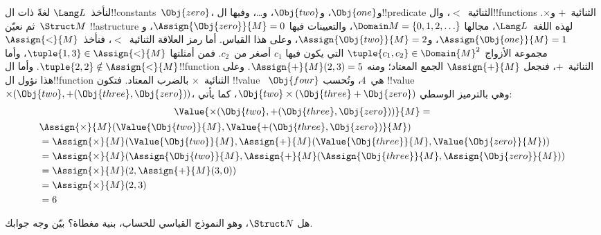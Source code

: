 \documentclass[../../../include/open-logic-section]{subfiles}
\begin{document}
\begin{ex}
لنأخذ~$\Lang L$ لغةً ذات ال!!{constant}s~$\Obj{zero}$،
و$\Obj{one}$، و$\Obj{two}$، و\dots، وفيها ال!!{predicate} الثنائية~$<$،
وال!!{function}s الثنائية~$+$ و$\times$. ثم نعيّن~$\Struct M$
!!a{structure} لهذه اللغة~$\Lang L$، مجالها
$\Domain M = \{0, 1, 2, \ldots \}$، والتعيينات فيها
$\Assign{\Obj{zero}}{M} = 0$، و$\Assign{\Obj{one}}{M} = 1$،
و$\Assign{\Obj{two}}{M} = 2$، وعلى هذا القياس. أما رمز العلاقة
الثنائية~$<$، فنأخذ~$\Assign{<}{M}$ مجموعة الأزواج
$\tuple{c_1, c_2} \in \Domain{M}^2$ التي يكون فيها $c_1$ أصغر
من~$c_2$. فمن أمثلتها $\tuple{1, 3} \in \Assign{<}{M}$، وأما
$\tuple{2, 2} \notin \Assign{<}{M}$. وأما
ال!!{function} الثنائية~$+$، فنجعل $\Assign{+}{M}$ الجمع
المعتاد؛ ومنه $\Assign{+}{M}(2,3)=5$. وعلى هذا نؤول
ال!!{function} الثنائية~$\times$ بالضرب المعتاد. فتكون !!{value}
~$\Obj{four}$ هي~$4$، وتُحسب !!{value}
~$\times(\Obj{two}, +(\Obj{three},\Obj{zero}))$، وهي بالترميز
الوسطي $\Obj{two} \times (\Obj{three} + \Obj{zero})$، كما يأتي:
\begin{multline*}
\Value{\times(\Obj{two}, +(\Obj{three},\Obj{zero}))}{M} =\\
\begin{aligned}
& \Assign{\times}{M}(\Value{\Obj{two}}{M}, \Value{+(\Obj{three}, \Obj{zero})}{M})\\
& = \Assign{\times}{M}(\Value{\Obj{two}}{M}, \Assign{+}{M}(\Value{\Obj{three}}{M},
\Value{\Obj{zero}}{M})) \\
& = \Assign{\times}{M}(\Assign{\Obj{two}}{M}, \Assign{+}{M}(\Assign{\Obj{three}}{M},
\Assign{\Obj{zero}}{M})) \\
& = \Assign{\times}{M}(2, \Assign{+}{M}(3, 0)) \\
& = \Assign{\times}{M}(2, 3) \\
& = 6
\end{aligned}
\end{multline*}
\end{ex}

\begin{prob}
هل $\Struct N$، وهو النموذج القياسي للحساب، بنية مغطاة؟ بيّن وجه جوابك.
\end{prob}
\end{document}
